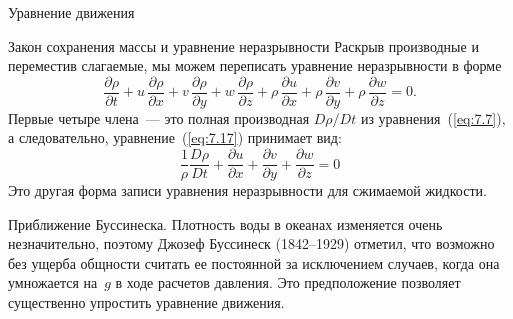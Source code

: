 \begin{chapter}{Уравнение движения}
\begin{section}{Закон сохранения массы и уравнение неразрывности}
Раскрыв производные и переместив слагаемые, мы можем переписать
уравнение неразрывности в форме
\begin{displaymath}
\frac{\partial{\rho}}{\partial{t}} + u\,\frac{\partial{\rho}}{\partial{x}} + v\,\frac{\partial{\rho}}{\partial{y}} + w\,\frac{\partial{\rho}}{\partial{z}} +
\rho\,\frac{\partial{u}}{\partial{x}} + \rho\,\frac{\partial{v}}{\partial{y}} + \rho\,\frac{\partial{w}}{\partial{z}} = 0.
\end{displaymath}
Первые четыре члена~--- это полная производная $D\rho/Dt$ из 
уравнения~(\ref{eq:7.7}), а следовательно, уравнение~(\ref{eq:7.17}) принимает
вид:
\begin{equation}\label{eq:7.18}
\boxed{\frac{1}{\rho}\frac{D\rho}{Dt} + \frac{\partial{u}}{\partial{x}} + \frac{\partial{v}}{\partial{y}} + \frac{\partial{w}}{\partial{z}} = 0}
\end{equation}
Это другая форма записи уравнения неразрывности для сжимаемой жидкости.
%

\begin{paragraph}{Приближение Буссинеска.}
Плотность воды в океанах изменяется очень незначительно, поэтому Джозеф 
Буссинеск (1842--1929) отметил, что возможно без ущерба общности считать
ее постоянной за исключением случаев, когда она умножается на~$g$ в ходе 
расчетов давления. Это предположение позволяет существенно упростить 
уравнение движения. 
%


\end{paragraph}
\end{section}
\end{chapter}

